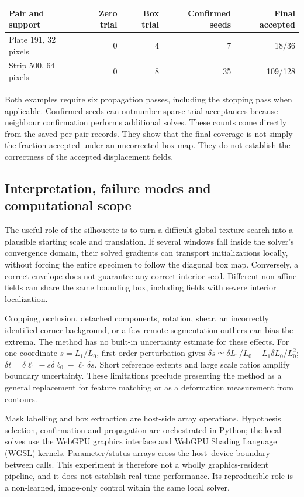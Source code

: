 \begin{center}\small
\begin{tabular}{lrrrr}\toprule
Pair and support & Zero trial & Box trial & Confirmed seeds & Final accepted\\
\midrule
Plate 191, 32 pixels & 0 & 4 & 7 & 18/36\\
Strip 500, 64 pixels & 0 & 8 & 35 & 109/128\\
\bottomrule\end{tabular}
\end{center}
Both examples require six propagation passes, including the stopping pass
when applicable. Confirmed seeds can outnumber sparse trial acceptances
because neighbour confirmation performs additional solves. These counts
come directly from the saved per-pair records. They show that the final
coverage is not simply the fraction accepted under an uncorrected box map.
They do not establish the correctness of the accepted displacement fields.

\subsection{Interpretation, failure modes and computational scope}
The useful role of the silhouette is to turn a difficult global texture
search into a plausible starting scale and translation. If several windows
fall inside the solver's convergence domain, their solved gradients can
transport initializations locally, without forcing the entire specimen to
follow the diagonal box map. Conversely, a correct envelope does not guarantee
any correct interior seed. Different non-affine fields can share the same
bounding box, including fields with severe interior localization.

Cropping, occlusion, detached components, rotation, shear, an incorrectly
identified corner background, or a few remote segmentation outliers can bias
the extrema. The method has no built-in uncertainty estimate for these
effects. For one coordinate $s=L_1/L_0$, first-order perturbation gives
$\delta s\simeq\delta L_1/L_0-L_1\delta L_0/L_0^2$;
$\delta t=\delta\ell_1-s\delta\ell_0-\ell_0\delta s$.
Short reference extents and large scale ratios amplify boundary uncertainty.
These limitations preclude presenting the method as a general replacement
for feature matching or as a deformation measurement from contours.

Mask labelling and box extraction are host-side array operations. Hypothesis
selection, confirmation and propagation are orchestrated in Python; the
local solves use the WebGPU graphics interface and WebGPU Shading Language
(WGSL) kernels. Parameter/status arrays cross the host--device boundary
between calls. This experiment is therefore not a wholly graphics-resident
pipeline, and it does not establish real-time performance. Its reproducible
role is a non-learned, image-only control within the same local solver.

